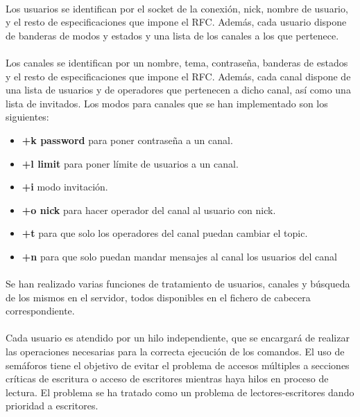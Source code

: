 \documentclass{mathnotes}
\begin{document}
\paragraph{}
Los usuarios se identifican por el socket de la conexión, nick, nombre de usuario, y el resto de especificaciones que impone el RFC. Además, cada usuario dispone de banderas de modos y estados y una lista de los canales a los que pertenece.
\paragraph{}
Los canales se identifican por un nombre, tema, contraseña, banderas de estados y el resto de especificaciones que impone el RFC. Además, cada canal dispone de una lista de usuarios y de operadores que pertenecen a dicho canal, así como una lista de invitados.
Los modos para canales que se han implementado son los siguientes:
\begin{itemize}
\item \textbf{+k password} para poner contraseña a un canal.
\item \textbf{+l limit} para poner límite de usuarios a un canal.
\item \textbf{+i} modo invitación.
\item \textbf{+o nick} para hacer operador del canal al usuario con nick.
\item \textbf{+t} para que solo los operadores del canal puedan cambiar el topic.
\item \textbf{+n} para que solo puedan mandar mensajes al canal los usuarios del canal
\end{itemize}
\paragraph{}
Se han realizado varias funciones de tratamiento de usuarios, canales y búsqueda de los mismos en el servidor, todos disponibles en el fichero de cabecera correspondiente.
\paragraph{}
Cada usuario es atendido por un hilo independiente, que se encargará de realizar las operaciones necesarias para la correcta ejecución de los comandos.
El uso de semáforos tiene el objetivo de evitar el problema de accesos múltiples a secciones críticas de escritura o acceso de escritores mientras haya hilos en proceso de lectura.
El problema se ha tratado como un problema de lectores-escritores dando prioridad a escritores.
\end{document}
